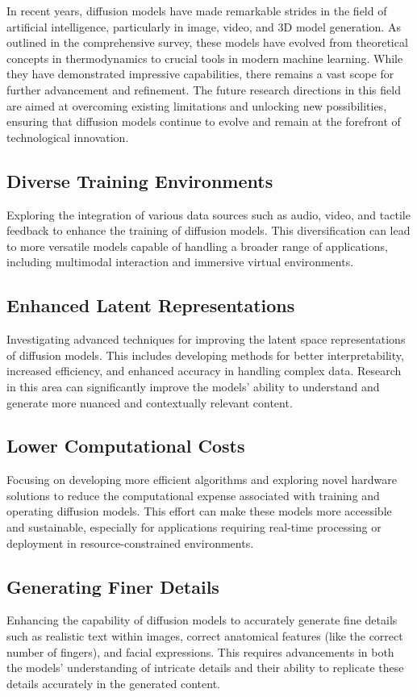 In recent years, diffusion models have made remarkable strides in the field of artificial intelligence, particularly in image, video, and 3D model generation. As outlined in the comprehensive survey, these models have evolved from theoretical concepts in thermodynamics to crucial tools in modern machine learning. While they have demonstrated impressive capabilities, there remains a vast scope for further advancement and refinement. The future research directions in this field are aimed at overcoming existing limitations and unlocking new possibilities, ensuring that diffusion models continue to evolve and remain at the forefront of technological innovation.

\subsection{Diverse Training Environments}
Exploring the integration of various data sources such as audio, video, and tactile feedback to enhance the training of diffusion models. This diversification can lead to more versatile models capable of handling a broader range of applications, including multimodal interaction and immersive virtual environments.
\subsection{Enhanced Latent Representations}
Investigating advanced techniques for improving the latent space representations of diffusion models. This includes developing methods for better interpretability, increased efficiency, and enhanced accuracy in handling complex data. Research in this area can significantly improve the models' ability to understand and generate more nuanced and contextually relevant content.
\subsection{Lower Computational Costs}
Focusing on developing more efficient algorithms and exploring novel hardware solutions to reduce the computational expense associated with training and operating diffusion models. This effort can make these models more accessible and sustainable, especially for applications requiring real-time processing or deployment in resource-constrained environments.
\subsection{Generating Finer Details}
Enhancing the capability of diffusion models to accurately generate fine details such as realistic text within images, correct anatomical features (like the correct number of fingers), and facial expressions. This requires advancements in both the models' understanding of intricate details and their ability to replicate these details accurately in the generated content.
